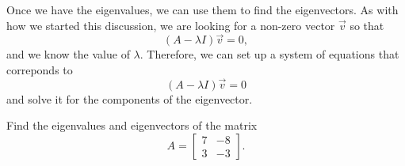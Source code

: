 \documentclass{ximera}
\begin{document}
Once we have the eigenvalues, we can use them to find the eigenvectors. As with how we started this discussion, we are looking for a non-zero vector $\vec{v}$ so that 
\[ 
    (A - \lambda I)\vec{v} = 0,
\] 
and we know the value of $\lambda$. Therefore, we can set up a system of equations that correponds to \[ (A - \lambda I)\vec{v} = 0\] and solve it for the components of the eigenvector. 

\begin{example}
    Find the eigenvalues and eigenvectors of the matrix
    \[ 
        A = 
        \begin{bmatrix} 
            7 & -8 \\ 
            3 & -3 
        \end{bmatrix}.
    \]
\end{example}
\end{document}

